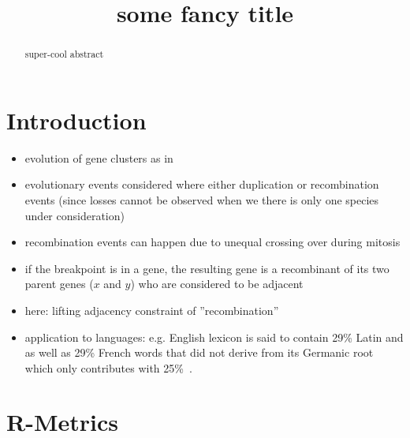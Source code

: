 \documentclass{article}
\newcommand{\TODO}[1]{\begingroup\color{red}#1\endgroup}
\begin{document}
\title{\TODO{some fancy title}}

\maketitle


\begin{abstract}
  super-cool abstract
\end{abstract}

\section{Introduction}

\begin{itemize}
\item evolution of gene clusters as in~\cite{Prohaska:17a}
 \item evolutionary events considered where either duplication 
 or recombination events (since losses cannot be observed when 
 we there is only one species under consideration)
 \item recombination events can happen due to unequal crossing
 over during mitosis
 \item if the breakpoint is in a gene, the resulting gene is
 a recombinant of its two parent genes ($x$ and $y$) who are
 considered to be adjacent
 \item here: lifting adjacency constraint of ''recombination''
 \item application to languages: e.g. English lexicon is said
 to contain 29\% Latin and as well as 29\% French words that 
 did not derive from its Germanic root which only contributes 
 with 25\%~\cite{Finkenstaedt:73}.
\end{itemize}


\section{R-Metrics} 
\end{document}
